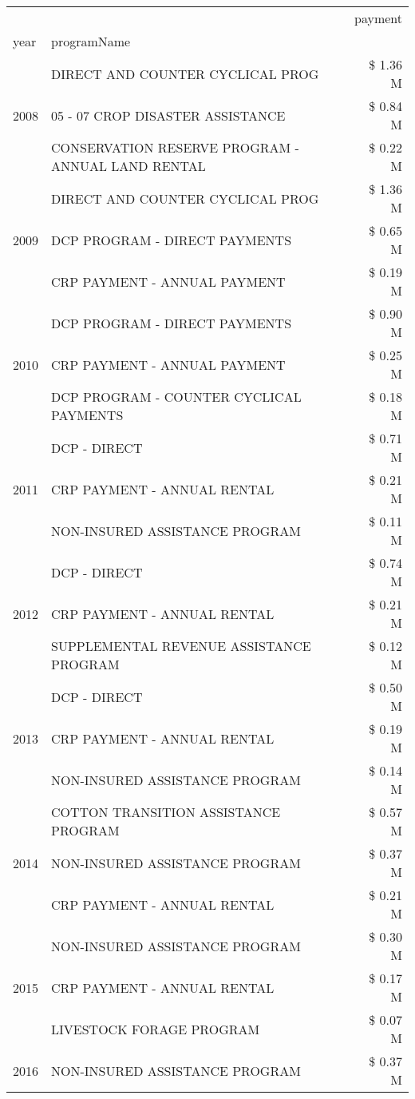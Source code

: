 \begin{tabular}{llr}
\toprule
 &  & payment \\
year & programName &  \\
\midrule
\multirow[t]{3}{*}{2008} & DIRECT AND COUNTER CYCLICAL PROG & \$ 1.36 M \\
 & 05 - 07 CROP DISASTER ASSISTANCE & \$ 0.84 M \\
 & CONSERVATION RESERVE PROGRAM - ANNUAL LAND RENTAL & \$ 0.22 M \\
\cline{1-3}
\multirow[t]{3}{*}{2009} & DIRECT AND COUNTER CYCLICAL PROG & \$ 1.36 M \\
 & DCP PROGRAM - DIRECT PAYMENTS & \$ 0.65 M \\
 & CRP PAYMENT - ANNUAL PAYMENT & \$ 0.19 M \\
\cline{1-3}
\multirow[t]{3}{*}{2010} & DCP PROGRAM - DIRECT PAYMENTS & \$ 0.90 M \\
 & CRP PAYMENT - ANNUAL PAYMENT & \$ 0.25 M \\
 & DCP PROGRAM - COUNTER CYCLICAL PAYMENTS & \$ 0.18 M \\
\cline{1-3}
\multirow[t]{3}{*}{2011} & DCP - DIRECT & \$ 0.71 M \\
 & CRP PAYMENT - ANNUAL RENTAL & \$ 0.21 M \\
 & NON-INSURED ASSISTANCE PROGRAM & \$ 0.11 M \\
\cline{1-3}
\multirow[t]{3}{*}{2012} & DCP - DIRECT & \$ 0.74 M \\
 & CRP PAYMENT - ANNUAL RENTAL & \$ 0.21 M \\
 & SUPPLEMENTAL REVENUE ASSISTANCE PROGRAM & \$ 0.12 M \\
\cline{1-3}
\multirow[t]{3}{*}{2013} & DCP - DIRECT & \$ 0.50 M \\
 & CRP PAYMENT - ANNUAL RENTAL & \$ 0.19 M \\
 & NON-INSURED ASSISTANCE PROGRAM & \$ 0.14 M \\
\cline{1-3}
\multirow[t]{3}{*}{2014} & COTTON TRANSITION ASSISTANCE PROGRAM & \$ 0.57 M \\
 & NON-INSURED ASSISTANCE PROGRAM & \$ 0.37 M \\
 & CRP PAYMENT - ANNUAL RENTAL & \$ 0.21 M \\
\cline{1-3}
\multirow[t]{3}{*}{2015} & NON-INSURED ASSISTANCE PROGRAM & \$ 0.30 M \\
 & CRP PAYMENT - ANNUAL RENTAL & \$ 0.17 M \\
 & LIVESTOCK FORAGE PROGRAM & \$ 0.07 M \\
\cline{1-3}
\multirow[t]{3}{*}{2016} & NON-INSURED ASSISTANCE PROGRAM                & \$ 0.37 M \\

\end{tabular}
